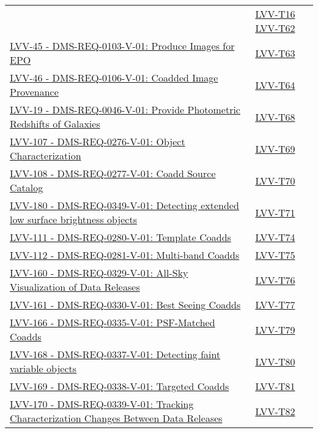 {\begin{longtable}[]{p{13cm}p{3cm}}
& {
\hyperref[lvv-t16]{LVV-T16}
\hyperref[lvv-t62]{LVV-T62}
} \\
\href{https://jira.lsstcorp.org/browse/LVV-45}{LVV-45 - DMS-REQ-0103-V-01: Produce Images for EPO}
& {
\hyperref[lvv-t63]{LVV-T63}
} \\
\href{https://jira.lsstcorp.org/browse/LVV-46}{LVV-46 - DMS-REQ-0106-V-01: Coadded Image Provenance}
& {
\hyperref[lvv-t64]{LVV-T64}
} \\
\href{https://jira.lsstcorp.org/browse/LVV-19}{LVV-19 - DMS-REQ-0046-V-01: Provide Photometric Redshifts of Galaxies}
& {
\hyperref[lvv-t68]{LVV-T68}
} \\
\href{https://jira.lsstcorp.org/browse/LVV-107}{LVV-107 - DMS-REQ-0276-V-01: Object Characterization}
& {
\hyperref[lvv-t69]{LVV-T69}
} \\
\href{https://jira.lsstcorp.org/browse/LVV-108}{LVV-108 - DMS-REQ-0277-V-01: Coadd Source Catalog}
& {
\hyperref[lvv-t70]{LVV-T70}
} \\
\href{https://jira.lsstcorp.org/browse/LVV-180}{LVV-180 - DMS-REQ-0349-V-01: Detecting extended  low surface brightness objects}
& {
\hyperref[lvv-t71]{LVV-T71}
} \\
\href{https://jira.lsstcorp.org/browse/LVV-111}{LVV-111 - DMS-REQ-0280-V-01: Template Coadds}
& {
\hyperref[lvv-t74]{LVV-T74}
} \\
\href{https://jira.lsstcorp.org/browse/LVV-112}{LVV-112 - DMS-REQ-0281-V-01: Multi-band Coadds}
& {
\hyperref[lvv-t75]{LVV-T75}
} \\
\href{https://jira.lsstcorp.org/browse/LVV-160}{LVV-160 - DMS-REQ-0329-V-01: All-Sky Visualization of Data Releases}
& {
\hyperref[lvv-t76]{LVV-T76}
} \\
\href{https://jira.lsstcorp.org/browse/LVV-161}{LVV-161 - DMS-REQ-0330-V-01: Best Seeing Coadds}
& {
\hyperref[lvv-t77]{LVV-T77}
} \\
\href{https://jira.lsstcorp.org/browse/LVV-166}{LVV-166 - DMS-REQ-0335-V-01: PSF-Matched Coadds}
& {
\hyperref[lvv-t79]{LVV-T79}
} \\
\href{https://jira.lsstcorp.org/browse/LVV-168}{LVV-168 - DMS-REQ-0337-V-01: Detecting faint variable objects}
& {
\hyperref[lvv-t80]{LVV-T80}
} \\
\href{https://jira.lsstcorp.org/browse/LVV-169}{LVV-169 - DMS-REQ-0338-V-01: Targeted Coadds}
& {
\hyperref[lvv-t81]{LVV-T81}
} \\
\href{https://jira.lsstcorp.org/browse/LVV-170}{LVV-170 - DMS-REQ-0339-V-01: Tracking Characterization Changes Between Data Releases}
& {
\hyperref[lvv-t82]{LVV-T82}
}
\end{longtable}}
